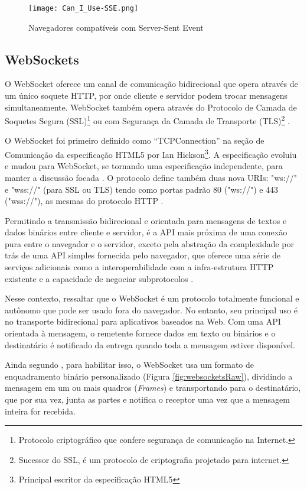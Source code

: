 \begin{figure}[H]
	\centering
	\caption{Navegadores compatíveis com Server-Sent Event}
	\texttt{[image: Can\_I\_Use-SSE.png]}
	\label{fig:sse}
\end{figure}

\subsection{WebSockets}

O WebSocket oferece um canal de comunicação bidirecional que opera através de um único soquete HTTP, por onde cliente e servidor podem trocar mensagens simultaneamente. WebSocket também opera através do Protocolo de Camada de Soquetes Segura (SSL)\footnote{Protocolo criptográfico que confere segurança de comunicação na Internet.} ou com Segurança da Camada de Transporte (TLS)\footnote{Sucessor do SSL, é um protocolo de criptografia projetado para internet.} \cite{lombardi2015websocket}.

O WebSocket foi primeiro definido como “TCPConnection” na seção de Comunicação da especificação HTML5 por Ian Hickson\footnote{Principal escritor da especificação HTML5}. A especificação evoluiu e mudou para WebSocket, se tornando uma especificação independente, para manter a discussão focada \cite{lubbers2011pro}. O protocolo define também duas nova URIs: "ws://" e "wss://" (para SSL ou TLS) tendo como portas padrão 80 ("ws://") e 443 ("wss://"), as mesmas do protocolo HTTP \cite{Saint-Andre2011}.

Permitindo a transmissão bidirecional e orientada para mensagens de textos e dados binários entre cliente e servidor, é a API mais próxima de uma conexão pura entre o navegador e o servidor, exceto pela abstração da complexidade por trás de uma API simples fornecida pelo navegador, que oferece uma série de serviços adicionais como a interoperabilidade com a infra-estrutura HTTP existente e a capacidade de negociar subprotocolos \cite{grigorik2013high}.

Nesse contexto,  ressaltar que o WebSocket é um protocolo totalmente funcional e autônomo que pode ser usado fora do navegador. No entanto, seu principal uso é no transporte bidirecional para aplicativos baseados na Web. Com uma API orientada à mensagem, o remetente fornece dados em texto ou binários e o destinatário é notificado da entrega quando toda a mensagem estiver disponível.

Ainda segundo , para habilitar isso, o WebSocket usa um formato de enquadramento binário personalizado (Figura \ref{fig:websocketsRaw}), dividindo a mensagem em um ou mais quadros (\emph{Frames}) e transportando para o destinatário, que por sua vez, junta as partes e notifica o receptor uma vez que a mensagem inteira for recebida.

